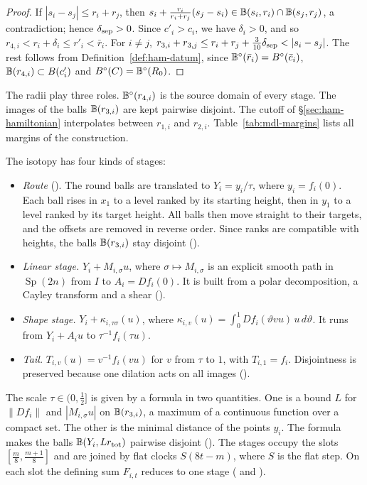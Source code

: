 \begin{proof}
If $|s_i-s_j|\le r_i+r_j$, then $s_i+\frac{r_i}{r_i+r_j}(s_j-s_i)\in\mathbb{B}(s_i,r_i)\cap\mathbb{B}(s_j,r_j)$, a contradiction; hence $\delta_{\rm sep}>0$. Since $c'_i>c_i$, we have $\delta_i>0$, and so $r_{4,i}<r_i+\delta_i\le r'_i<\bar r_i$. For $i\ne j$, $r_{3,i}+r_{3,j}\le r_i+r_j+\frac{3}{10}\delta_{\rm sep}<|s_i-s_j|$. The rest follows from Definition~\ref{def:ham-datum}, since $\mathbb{B}^\circ(\bar r_i)=B^{\circ}(\bar c_i)$, $\mathbb{B}(r_{4,i})\subset B(c'_i)$ and $B^{\circ}(C)=\mathbb{B}^\circ(R_0)$.
\end{proof}

The radii play three roles. $\mathbb{B}^\circ(r_{4,i})$ is the source domain of every stage. The images of the balls $\mathbb{B}(r_{3,i})$ are kept pairwise disjoint. The cutoff of \S\ref{sec:ham-hamiltonian} interpolates between $r_{1,i}$ and $r_{2,i}$. Table~\ref{tab:mdl-margins} lists all margins of the construction.

The isotopy has four kinds of stages:
\begin{itemize}
\item \emph{Route} (). The round balls are translated to $Y_i=y_i/\tau$, where $y_i=f_i(0)$. Each ball rises in $x_1$ to a level ranked by its starting height, then in $y_1$ to a level ranked by its target height. All balls then move straight to their targets, and the offsets are removed in reverse order. Since ranks are compatible with heights, the balls $\mathbb{B}(r_{3,i})$ stay disjoint ().
\item \emph{Linear stage.} $Y_i+M_{i,\sigma}u$, where $\sigma\mapsto M_{i,\sigma}$ is an explicit smooth path in $\operatorname{Sp}(2n)$ from $I$ to $A_i=Df_i(0)$. It is built from a polar decomposition, a Cayley transform and a shear ().
\item \emph{Shape stage.} $Y_i+\kappa_{i,\tau\sigma}(u)$, where $\kappa_{i,v}(u)=\int_0^1Df_i(\vartheta vu)\,u\,d\vartheta$. It runs from $Y_i+A_iu$ to $\tau^{-1}f_i(\tau u)$.
\item \emph{Tail.} $T_{i,v}(u)=v^{-1}f_i(vu)$ for $v$ from $\tau$ to $1$, with $T_{i,1}=f_i$. Disjointness is preserved because one dilation acts on all images ().
\end{itemize}
The scale $\tau\in(0,\frac12]$ is given by a formula in two quantities. One is a bound $L$ for $\|Df_i\|$ and $|M_{i,\sigma}u|$ on $\mathbb{B}(r_{3,i})$, a maximum of a continuous function over a compact set. The other is the minimal distance of the points $y_i$. The formula makes the balls $\mathbb{B}(Y_i,Lr_{\rm tot})$ pairwise disjoint (). The stages occupy the slots $[\frac m8,\frac{m+1}8]$ and are joined by flat clocks $S(8t-m)$, where $S$ is the flat step. On each slot the defining sum $F_{i,t}$ reduces to one stage ( and ).

